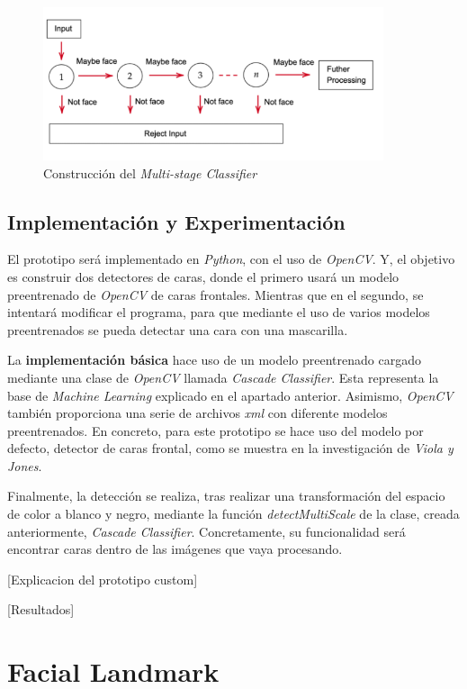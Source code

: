 \begin{figure}[htp]
	\centering
	\includegraphics[width=10cm]{imagenes/ada2.png}
	\caption{Construcción del \textit{Multi-stage Classifier}}
	\label{fig:ada2}
\end{figure}


\subsection*{Implementación y Experimentación}

El prototipo será implementado en \textit{Python}, con el uso de \textit{OpenCV}. Y, el objetivo es construir dos detectores de caras, donde el primero usará un modelo preentrenado de \textit{OpenCV} de caras frontales. Mientras que en el segundo, se intentará modificar el programa, para que mediante el uso de varios modelos preentrenados se pueda detectar una cara con una mascarilla.

La \textbf{implementación básica} hace uso de un modelo preentrenado cargado mediante una clase de \textit{OpenCV} llamada \textit{Cascade Classifier}. Esta representa la base de \textit{Machine Learning} explicado en el apartado anterior. Asimismo, \textit{OpenCV} también proporciona una serie de archivos \textit{xml} con diferente modelos preentrenados. En concreto, para este prototipo se hace uso del modelo por defecto, detector de caras frontal, como se muestra en la investigación de \textit{Viola y Jones}.

Finalmente, la detección se realiza, tras realizar una transformación del espacio de color a blanco y negro, mediante la función \textit{detectMultiScale} de la clase, creada anteriormente, \textit{Cascade Classifier}. Concretamente, su funcionalidad será encontrar caras dentro de las imágenes que vaya procesando.

[Explicacion del prototipo custom]

[Resultados]

\section{Facial Landmark}

